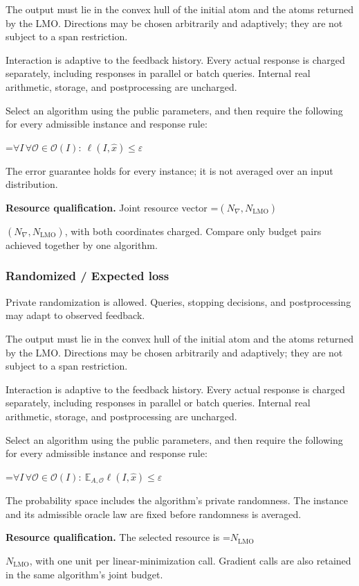 \documentclass[10pt,a4paper]{article}
\newcommand{\AtlasMath}[1]{\par\begingroup\centering\setbox0=\hbox{$\displaystyle #1$}\ifdim\wd0>1.4\linewidth\typeout{ATLAS WIDE FORMULA: \the\wd0}\fi\ifdim\wd0>\linewidth\resizebox{\linewidth}{!}{\box0}\else\box0\fi\par\endgroup}
\newcommand{\AtlasInlineMath}[1]{\begingroup\setbox0=\hbox{$#1$}\ifdim\wd0>.4\linewidth\endgroup\AtlasMath{#1}\else\endgroup$#1$\fi}
\begin{document}
The output must lie in the convex hull of the initial atom and the atoms returned by the LMO. Directions may be chosen arbitrarily and adaptively; they are not subject to a span restriction.

Interaction is adaptive to the feedback history. Every actual response is charged separately, including responses in parallel or batch queries. Internal real arithmetic, storage, and postprocessing are uncharged.

Select an algorithm using the public parameters, and then require the following for every admissible instance and response rule:


\AtlasMath{\forall I\,\forall\mathcal{O}\in\mathcal{O}(I):\ \ell(I,\widehat{x})\le\varepsilon}


The error guarantee holds for every instance; it is not averaged over an input distribution.

\textbf{Resource qualification.} Joint resource vector \AtlasInlineMath{(N_\nabla,N_{\mathrm{LMO}})}, with both coordinates charged. Compare only budget pairs achieved together by one algorithm.

\subsubsection{Randomized / Expected loss}
Private randomization is allowed. Queries, stopping decisions, and postprocessing may adapt to observed feedback.

The output must lie in the convex hull of the initial atom and the atoms returned by the LMO. Directions may be chosen arbitrarily and adaptively; they are not subject to a span restriction.

Interaction is adaptive to the feedback history. Every actual response is charged separately, including responses in parallel or batch queries. Internal real arithmetic, storage, and postprocessing are uncharged.

Select an algorithm using the public parameters, and then require the following for every admissible instance and response rule:


\AtlasMath{\forall I\,\forall\mathcal{O}\in\mathcal{O}(I):\ \mathbb{E}_{A,\mathcal{O}}\ell(I,\widehat{x})\le\varepsilon}


The probability space includes the algorithm's private randomness. The instance and its admissible oracle law are fixed before randomness is averaged.

\textbf{Resource qualification.} The selected resource is \AtlasInlineMath{N_{\mathrm{LMO}}}, with one unit per linear-minimization call. Gradient calls are also retained in the same algorithm's joint budget.
\end{document}
